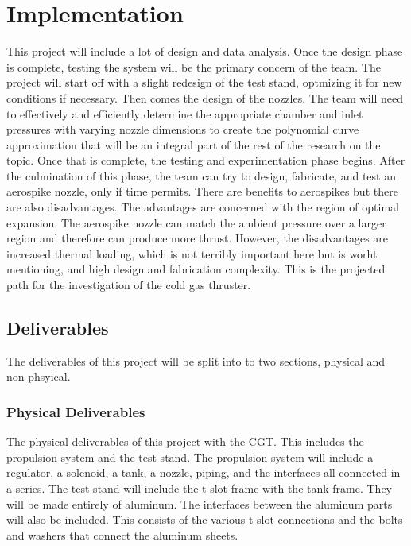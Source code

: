 \documentclass[conference]{IEEEtran} %
\begin{document}

\section{Implementation}
\label{sec:implementation}

This project will include a lot of design and data analysis. Once the design phase
is complete, testing the system will be the primary concern of the team. The project will start off with a slight redesign of the test stand, optmizing it for new conditions if necessary.
Then comes the design of the nozzles. The team will need to effectively and efficiently determine the appropriate chamber and inlet pressures with varying
nozzle dimensions to create the polynomial curve approximation that will be an integral part of the rest of the research on the topic. Once that is complete, the
testing and experimentation phase begins. After the culmination of this phase, the team can try to design, fabricate, and test an aerospike nozzle, only if time permits.
There are benefits to aerospikes but there are also disadvantages. The advantages are concerned with the region of optimal expansion. The aerospike nozzle can match the
ambient pressure over a larger region and therefore can produce more thrust. However, the disadvantages are increased thermal loading, which is not terribly important here but is worht mentioning,
and high design and fabrication complexity. This is the projected path for the investigation of the cold gas thruster.
\subsection{Deliverables}
\label{subsec:deliverables}
The deliverables of this project will be split into to two sections, physical and non-phsyical.

\subsubsection{Physical Deliverables}
\label{subsubsec: physical deliverables}

The physical deliverables of this project with the CGT\@. This includes the propulsion system and the test stand. The propulsion system will include a regulator,
a solenoid, a tank, a nozzle, piping, and the interfaces all connected in a series. The test stand will include the t-slot frame with the tank frame. They will be made entirely of aluminum. The interfaces between the aluminum parts will also be included. This
consists of the various t-slot connections and the bolts and washers that connect the aluminum sheets.
\end{document}

